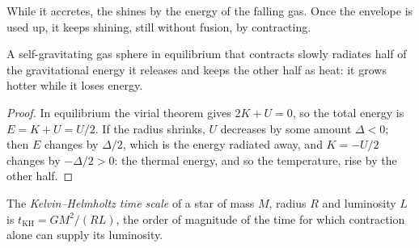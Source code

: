 \begin{omfigure}
\par{}
\end{omfigure}

While it accretes, the  shines by the energy of the falling gas. Once
the envelope is used up, it keeps shining, still without fusion, by
contracting.

\begin{proposition}
\label{prop:b2:ism-star-formation:contraction}
A self-gravitating gas sphere in equilibrium that contracts slowly radiates
half of the gravitational energy it releases and keeps the other half as heat:
it grows hotter while it loses energy.
\end{proposition}

\begin{proof}
In equilibrium the virial theorem gives $2K + U = 0$, so the total energy is
$E = K + U = U/2$. If the radius shrinks, $U$ decreases by some amount
$\Delta < 0$; then $E$ changes by $\Delta/2$, which is the energy radiated
away, and $K = -U/2$ changes by $-\Delta/2 > 0$: the thermal energy, and so
the temperature, rise by the other half.
\end{proof}

\begin{definition}\label{def:b2:ism-star-formation:kh-time}
The \emph{Kelvin--Helmholtz time scale}
of a star of mass $M$, radius $R$ and luminosity $L$ is
$t_{\mathrm{KH}} = GM^2/(RL)$, the order of magnitude of the time for which
contraction alone can supply its luminosity.
\end{definition}


